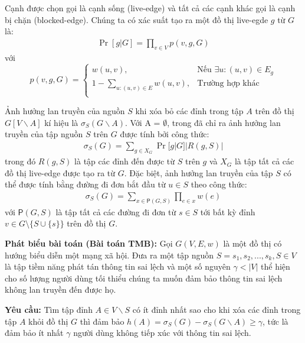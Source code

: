 Cạnh được chọn gọi là cạnh sống (live-edge) và tất cả các cạnh khác gọi là cạnh bị chặn (blocked-edge). Chúng ta có xác suất tạo ra một đồ thị live-egde $g$ từ $G$ là:
\begin{align}
\Pr[g|G]=\prod_{v \in V}{p(v,g,G)}
\end{align}
với
\begin{equation}
p(v, g, G)= \left\{ \begin{array}{ll}
w(u, v), & \mbox{Nếu $\exists u: (u, v) \in E_g$}\\
1-\sum_{u:(u, v) \in E}{w(u, v)}, & \mbox{Trường hợp khác}\\
\end{array} \right.
\end{equation}

Ảnh hưởng lan truyền của nguồn $S$ khi xóa bỏ các đỉnh trong tập $A$ trên đồ thị $G[V \backslash A]$ kí hiệu là $\sigma_{S}(G \backslash A)$. Với A = $\emptyset$, trong \cite{kemple1} đã chỉ ra ảnh hưởng lan truyền của tập nguồn $S$ trên $G$ được tính bởi công thức:
\begin{align}
\sigma_S(G)=\sum_{g \in X_G}{\Pr[g|G]|R(g, S)|}
\label{inf_cal}
\end{align}
trong đó $R(g, S)$ là tập các đỉnh đến được từ $S$ trên $g$ và $X_G$ là tập tất cả các đồ thị live-edge được tạo ra từ $G$. Đặc biệt, ảnh hưởng lan truyền của tập $S$ có thể được tính bằng đường đi đơn bắt đầu từ $u \in S$ theo công thức: 
\begin{align}
\sigma_{S}(G)=\sum_{x \in \mathsf{P}(G, S)} \prod_{e \in x}w(e)
\label{inf_path}
\end{align} 				
với $\mathsf{P}(G, S)$ là tập tất cả các đường đi đơn từ $s \in S$ tới bất kỳ đỉnh $v \in G \setminus \{S \cup \{s\} \} $ trên đồ thị $G$.		

\textbf{Phát biểu bài toán (Bài toán TMB):} Gọi $G(V,E,w)$ là một đồ thị có hướng biểu diễn một mạng xã hội. Đưa ra một tập nguồn $S = {s_{1}, s_{2}, ... , s_{k}}, S \in V$ là tập tiềm năng phát tán thông tin sai lệch và một số nguyên $\gamma < | V |$ thể hiện cho số lượng người dùng tối thiểu chúng ta muốn đảm bảo thông tin sai lệch không lan truyền đến được họ.

\textbf{Yêu cầu:} Tìm tập đỉnh $A \in V \backslash S$ có ít đỉnh nhất sao cho khi xóa các đỉnh trong tập $A$ khỏi đồ thị $G$ thì đảm bảo $h(A) = \sigma_{S}(G) - \sigma_{S}(G \backslash A) \geq \gamma$, tức là đảm bảo ít nhất $\gamma$ người dùng không tiếp xúc với thông tin sai lệch.
